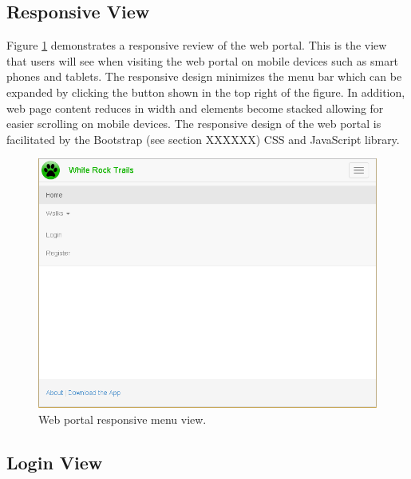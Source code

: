 \documentclass[11pt,a4paper]{article}
\begin{document}
\subsection{Responsive View}

Figure \ref{fig:home-responsive} demonstrates a responsive review of the web portal. This is the view that users will see when visiting the web portal on mobile devices such as smart phones and tablets. The responsive design minimizes the menu bar which can be expanded by clicking the button shown in the top right of the figure. In addition, web page content reduces in width and elements become stacked allowing for easier scrolling on mobile devices. The responsive design of the web portal is facilitated by the Bootstrap (see section XXXXXX) CSS and JavaScript library.

\begin{figure}[H]
\centering
\includegraphics[width=0.8\linewidth]{./img/webportal/home-responsive}
\caption{Web portal responsive menu view.}
\label{fig:home-responsive}
\end{figure}

\subsection{Login View}
\end{document}
